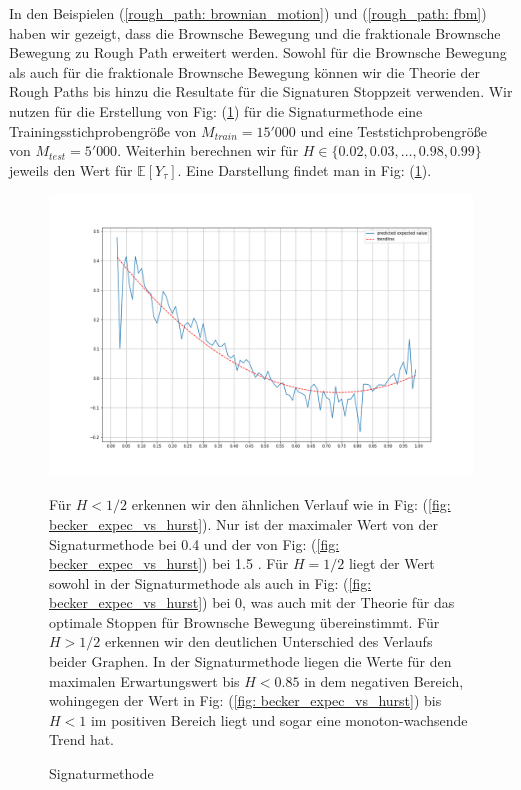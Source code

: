 \documentclass[12pt,titlepage,headsepline]{article}
\begin{document}
        \hfill\break
        In den Beispielen (\ref{rough_path: brownian_motion}) und (\ref{rough_path: fbm}) haben wir gezeigt, dass die Brownsche Bewegung und die fraktionale Brownsche Bewegung zu Rough Path erweitert werden. Sowohl für die Brownsche Bewegung als auch für die fraktionale Brownsche Bewegung können wir die Theorie der Rough Paths bis hinzu die Resultate für die Signaturen Stoppzeit verwenden.
        \hfill\break
        Wir nutzen für die Erstellung von Fig: (\ref{fig: signatur_methode}) für die Signaturmethode eine Trainingsstichprobengröße von $M_{train}=15'000$ und eine Teststichprobengröße von $M_{test}=5'000$. Weiterhin berechnen wir für $H \in \{0.02,0.03,\ldots,0.98,0.99\}$ jeweils den Wert für $\mathbb{E}[Y_{\tau}]$. Eine Darstellung findet man in Fig:
        (\ref{fig: signatur_methode}).
        \begin{figure}[H]
          \caption{Signaturmethode}\label{fig: signatur_methode}
          \centering
          \includegraphics[width=\textwidth]{signatur_methode.png}
          {\footnotesize
          Für $H<1/2$ erkennen wir den ähnlichen Verlauf wie in Fig: (\ref{fig: becker_expec_vs_hurst}). Nur ist der maximaler Wert von der Signaturmethode bei 0.4 und der von Fig: (\ref{fig: becker_expec_vs_hurst}) bei 1.5 . Für $H=1/2$ liegt der Wert sowohl in der Signaturmethode als auch in Fig: (\ref{fig: becker_expec_vs_hurst}) bei 0, was auch mit der Theorie für das optimale Stoppen für Brownsche Bewegung übereinstimmt. Für $H>1/2$ erkennen wir den deutlichen Unterschied des Verlaufs beider Graphen. In der Signaturmethode liegen die Werte für den maximalen Erwartungswert bis $H<0.85$ in dem negativen Bereich, wohingegen der Wert in Fig: (\ref{fig: becker_expec_vs_hurst}) bis $H<1$ im positiven Bereich liegt und sogar eine monoton-wachsende Trend hat.
          \par}
        \end{figure}
\end{document}
